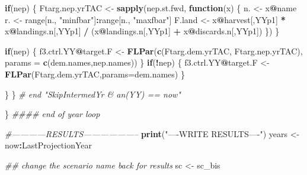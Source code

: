 \documentclass[
]{article}
\newenvironment{Shaded}{\begin{snugshade}}{\end{snugshade}}
\newcommand{\CommentTok}[1]{\textcolor[rgb]{0.56,0.35,0.01}{\textit{#1}}}
\newcommand{\ControlFlowTok}[1]{\textcolor[rgb]{0.13,0.29,0.53}{\textbf{#1}}}
\newcommand{\DataTypeTok}[1]{\textcolor[rgb]{0.13,0.29,0.53}{#1}}
\newcommand{\KeywordTok}[1]{\textcolor[rgb]{0.13,0.29,0.53}{\textbf{#1}}}
\newcommand{\NormalTok}[1]{#1}
\newcommand{\OperatorTok}[1]{\textcolor[rgb]{0.81,0.36,0.00}{\textbf{#1}}}
\newcommand{\StringTok}[1]{\textcolor[rgb]{0.31,0.60,0.02}{#1}}
\begin{document}
\begin{Shaded}
\begin{Highlighting}[]
{{{{{        \ControlFlowTok{if}\NormalTok{(nep) \{}
\NormalTok{        Ftarg.nep.yrTAC <-}\StringTok{ }\KeywordTok{sapply}\NormalTok{(nep.st.fwd, }\ControlFlowTok{function}\NormalTok{(x) \{}
\NormalTok{                      n. <-}\StringTok{ }\NormalTok{x}\OperatorTok{@}\NormalTok{name}
\NormalTok{                      r. <-}\StringTok{ }\NormalTok{range[n., }\StringTok{"minfbar"}\NormalTok{]}\OperatorTok{:}\NormalTok{range[n., }\StringTok{"maxfbar"}\NormalTok{]}
\NormalTok{                      F.land <-}\StringTok{ }\NormalTok{x}\OperatorTok{@}\NormalTok{harvest[,YYp1] }\OperatorTok{*}\StringTok{ }\NormalTok{x}\OperatorTok{@}\NormalTok{landings.n[,YYp1] }\OperatorTok{/}\StringTok{ }\NormalTok{(x}\OperatorTok{@}\NormalTok{landings.n[,YYp1] }\OperatorTok{+}\StringTok{ }\NormalTok{x}\OperatorTok{@}\NormalTok{discards.n[,YYp1])}
\NormalTok{                      \})}
\NormalTok{        \}}

    \ControlFlowTok{if}\NormalTok{(nep) \{}
\NormalTok{        f3.ctrl.YY}\OperatorTok{@}\NormalTok{target.F <-}\StringTok{  }\KeywordTok{FLPar}\NormalTok{(}\KeywordTok{c}\NormalTok{(Ftarg.dem.yrTAC, Ftarg.nep.yrTAC), }\DataTypeTok{params =} \KeywordTok{c}\NormalTok{(dem.names,nep.names))}
\NormalTok{    \}}
    \ControlFlowTok{if}\NormalTok{(}\OperatorTok{!}\NormalTok{nep) \{}
\NormalTok{    f3.ctrl.YY}\OperatorTok{@}\NormalTok{target.F <-}\StringTok{ }\KeywordTok{FLPar}\NormalTok{(Ftarg.dem.yrTAC,}\DataTypeTok{params=}\NormalTok{dem.names)}
\NormalTok{    \}}

\NormalTok{            \}}
\NormalTok{        \} }\CommentTok{# end "SkipIntermedYr & an(YY) == now"}

\NormalTok{  \} }\CommentTok{#### end of year loop}

    \CommentTok{#------------RESULTS--------------------}
    \KeywordTok{print}\NormalTok{(}\StringTok{"----WRITE RESULTS----"}\NormalTok{)}
\NormalTok{    years <-}\StringTok{ }\NormalTok{now}\OperatorTok{:}\NormalTok{LastProjectionYear}
    
    \CommentTok{## change the scenario name back for results}
\NormalTok{    sc <-}\StringTok{ }\NormalTok{sc_bis}

}}}}}
\end{Highlighting}
\end{Shaded}
\end{document}
